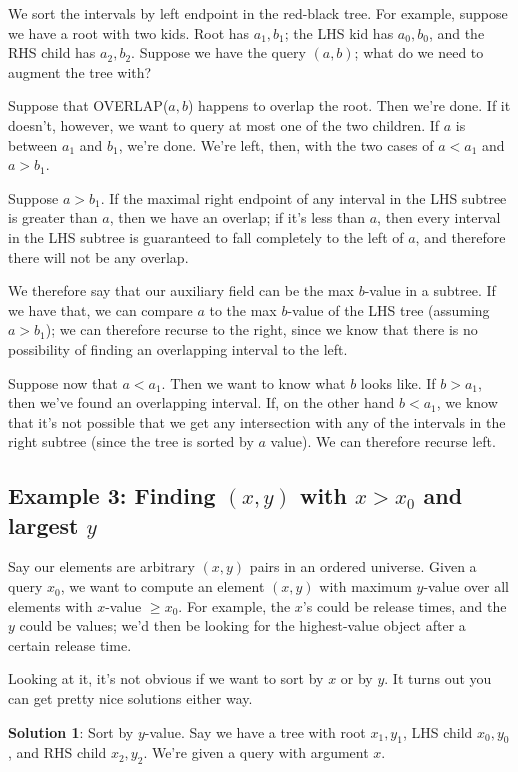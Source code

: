 \documentclass{article}
\begin{document}
We sort the intervals by left endpoint in the red-black tree.
For example, suppose we have a root with two kids. Root has $a_1,b_1$;
the LHS kid has $a_0,b_0$, and the RHS child has $a_2,b_2$.
Suppose we have the query $(a,b)$; what do we need to augment the tree with?

Suppose that OVERLAP($a,b$) happens to overlap the root. Then we're done.
If it doesn't, however, we want to query at most one of the two children.
If $a$ is between $a_1$ and $b_1$, we're done. We're left, then,
with the two cases of $a < a_1$ and $a > b_1$.

Suppose $a > b_1$.
If the maximal right endpoint of any interval
in the LHS subtree is greater than $a$, then we have an overlap; if it's
less than $a$, then every interval in the LHS subtree is guaranteed to fall 
completely
to the left of $a$, and therefore there will not be any overlap.

We therefore say that our auxiliary field can be the max $b$-value in a 
subtree. 
If we have that, we can compare $a$ to the max $b$-value of the LHS tree
(assuming $a > b_1$); we can therefore recurse to the right, since we
know that there is no possibility of finding an overlapping interval to the 
left.


Suppose now that $a < a_1$.
Then we want to know what $b$ looks like.
If $b > a_1$, then we've found an overlapping interval.
If, on the other hand $b < a_1$, we know that it's not possible
that we get any intersection with any of the intervals in the right subtree
(since the tree is sorted by $a$ value).
We can therefore recurse left.



\subsection{Example 3: Finding $(x,y)$ with $x > x_0$ and largest $y$}

Say our elements are arbitrary $(x,y)$ pairs in an ordered universe.
Given a query $x_0$, we want to compute an element $(x,y)$ with
maximum $y$-value over all elements with $x$-value $\geq x_0$.
For example, the $x$'s could be release times, and the $y$ could be values;
we'd then be looking for the highest-value object after a certain release
time.

Looking at it, it's not obvious if we want to sort by $x$ or by $y$.
It turns out you can get pretty nice solutions either way.

\textbf{Solution 1}: Sort by $y$-value.
Say we have a tree with root $x_1,y_1$, LHS child $x_0,y_0$, and
RHS child $x_2, y_2$.
We're given a query with argument $x$.
\end{document}
